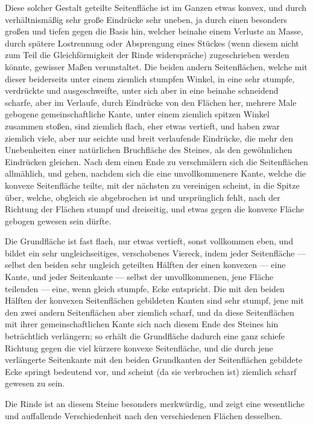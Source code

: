 \documentclass[a4paper, 11pt, oneside, german]{article}
\begin{document}
Diese solcher Gestalt geteilte Seitenfläche ist im Ganzen etwas konvex, und durch verhältnismäßig sehr große Eindrücke sehr uneben, ja durch einen besonders großen und tiefen gegen die Basis hin, welcher beinahe einem Verluste an Masse, durch spätere Lostrennung oder Absprengung eines Stückes (wenn diesem nicht zum Teil die Gleichförmigkeit der Rinde widerspräche) zugeschrieben werden könnte, gewisser Maßen verunstaltet. Die beiden andern Seitenflächen, welche mit dieser beiderseits unter einem ziemlich stumpfen Winkel, in eine sehr stumpfe, verdrückte und ausgeschweifte, unter sich aber in eine beinahe schneidend scharfe, aber im Verlaufe, durch Eindrücke von den Flächen her, mehrere Male gebogene gemeinschaftliche Kante, unter einem ziemlich spitzen Winkel zusammen stoßen, sind ziemlich flach, eher etwas vertieft, und haben zwar ziemlich viele, aber nur seichte und breit verlaufende Eindrücke, die mehr den Unebenheiten einer natürlichen Bruchfläche des Steines, als den gewöhnlichen Eindrücken gleichen. Nach dem einen Ende zu verschmälern sich die Seitenflächen allmählich, und gehen, nachdem sich die eine unvollkommenere Kante, welche die konvexe Seitenfläche teilte, mit der nächsten zu vereinigen scheint, in die Spitze über, welche, obgleich sie abgebrochen ist und ursprünglich fehlt, nach der Richtung der Flächen stumpf und dreiseitig, und etwas gegen die konvexe Fläche gebogen gewesen sein dürfte.

Die Grundfläche ist fast flach, nur etwas vertieft, sonst vollkommen eben, und bildet ein sehr ungleichseitiges, verschobenes Viereck, indem jeder Seitenfläche --- selbst den beiden sehr ungleich geteilten Hälften der einen konvexen --- eine Kante, und jeder Seitenkante --- selbst der unvollkommenen, jene Fläche teilenden --- eine, wenn gleich stumpfe, Ecke entspricht. Die mit den beiden Hälften der konvexen Seitenflächen gebildeten Kanten sind sehr stumpf, jene mit den zwei andern Seitenflächen aber ziemlich scharf, und da diese Seitenflächen mit ihrer gemeinschaftlichen Kante sich nach diesem Ende des Steines hin beträchtlich verlängern; so erhält die Grundfläche dadurch eine ganz schiefe Richtung gegen die viel kürzere konvexe Seitenfläche, und die durch jene verlängerte Seitenkante mit den beiden Grundkanten der Seitenflächen gebildete Ecke springt bedeutend vor, und scheint (da sie verbrochen ist) ziemlich scharf gewesen zu sein.

Die Rinde ist an diesem Steine besonders merkwürdig, und zeigt eine wesentliche und auffallende Verschiedenheit nach den verschiedenen Flächen desselben.
\end{document}
